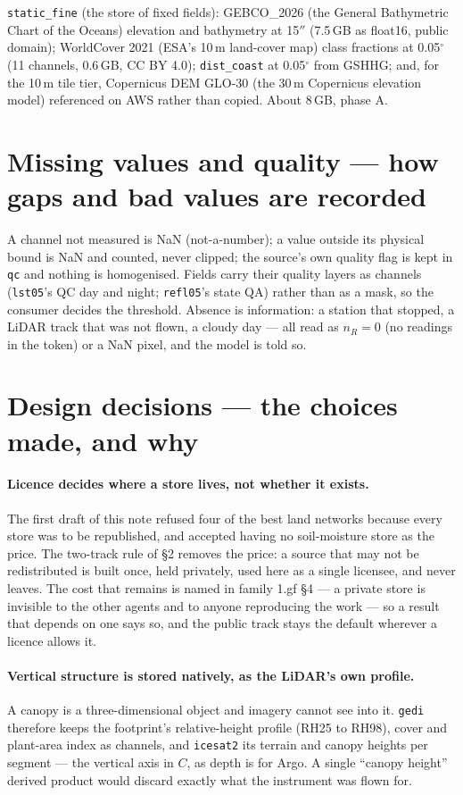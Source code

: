 \documentclass[10pt]{article}
\newcommand{\code}[1]{\texttt{#1}}
\begin{document}
\code{static\_fine} (the store of fixed fields): GEBCO\_2026 (the General Bathymetric Chart of the Oceans) elevation and bathymetry at 15$''$
(7.5\,GB as float16, public domain); WorldCover 2021 (ESA's 10\,m land-cover map) class fractions at
0.05$^\circ$ (11 channels, 0.6\,GB, CC BY 4.0); \code{dist\_coast} at
0.05$^\circ$ from GSHHG; and, for the 10\,m tile tier, Copernicus DEM GLO-30 (the 30\,m Copernicus elevation model)
referenced on AWS rather than copied. About 8\,GB, phase A.

\section{Missing values and quality --- how gaps and bad values are recorded}

A channel not measured is NaN (not-a-number); a value outside its physical bound is NaN and
counted, never clipped; the source's own quality flag is kept in \code{qc}
and nothing is homogenised. Fields carry their quality layers as channels
(\code{lst05}'s QC day and night; \code{refl05}'s state QA) rather than as a
mask, so the consumer decides the threshold. Absence is information: a
station that stopped, a LiDAR track that was not flown, a cloudy day --- all
read as $n_R = 0$ (no readings in the token) or a NaN pixel, and the model is told so.

\section{Design decisions --- the choices made, and why}

\paragraph{Licence decides where a store lives, not whether it exists.} The
first draft of this note refused four of the best land networks because
every store was to be republished, and accepted having no soil-moisture
store as the price. The two-track rule of \S2 removes the price: a source
that may not be redistributed is built once, held privately, used here as a
single licensee, and never leaves. The cost that remains is named in family
1.gf \S4 --- a private store is invisible to the other agents and to anyone
reproducing the work --- so a result that depends on one says so, and the
public track stays the default wherever a licence allows it.

\paragraph{Vertical structure is stored natively, as the LiDAR's own
profile.} A canopy is a three-dimensional object and imagery cannot see
into it. \code{gedi} therefore keeps the footprint's relative-height profile
(RH25 to RH98), cover and plant-area index as channels, and \code{icesat2}
its terrain and canopy heights per segment --- the vertical axis in $C$, as
depth is for Argo. A single ``canopy height'' derived product would discard
exactly what the instrument was flown for.
\end{document}
